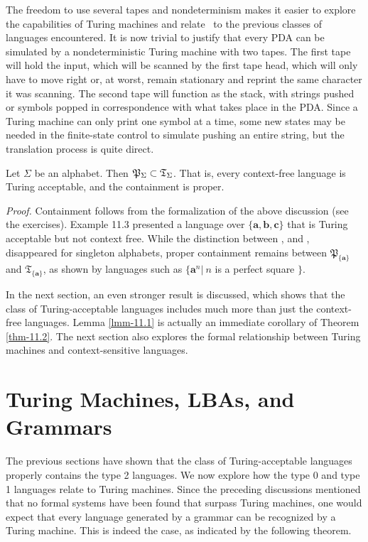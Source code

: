The freedom to use several tapes and nondeterminism makes it easier to explore
the capabilities of Turing machines and relate \TSIG\ to the previous classes of
languages encountered. It is now trivial to justify that every PDA can be
simulated by a nondeterministic Turing machine with two tapes. The first tape
will hold the input, which will be scanned by the first tape head, which will
only have to move right or, at worst, remain stationary and reprint the same
character it was scanning. The second tape will function as the stack, with
strings pushed or symbols popped in correspondence with what takes place in the
PDA. Since a Turing machine can only print one symbol at a time, some new states
may be needed in the finite-state control to simulate pushing an entire string,
but the translation process is quite direct.

\begin{lmm}\label{lmm-11.1}
Let $\Sigma$ be an alphabet. Then $\mathfrak{P}_\Sigma\subset\mathfrak{T}_\Sigma$. That is, every
context-free language is Turing acceptable, and the containment is proper.

\emph{Proof.} Containment follows from the formalization of the above discussion
(see the exercises). Example 11.3 presented a language over $\{\pmb{a},\pmb{b},
\pmb{c}\}$ that is Turing acceptable but not context free. While the distinction
between \DSIG, and \PSIG, disappeared for singleton alphabets, proper
containment remains between $\mathfrak{P}_{\{\pmb{a}\}}$ and $\mathfrak{T}_{\{
\pmb{a}\}}$, as shown by languages such as $\{\pmb{a}^n|\ n$ is a perfect square
$\}$.
\end{lmm}

In the next section, an even stronger result is discussed, which shows that the
class of Turing-acceptable languages includes much more than just the
context-free languages. Lemma \ref{lmm-11.1} is actually an immediate corollary of Theorem
\ref{thm-11.2}. The next section also explores the formal relationship between Turing
machines and context-sensitive languages.

\section{Turing Machines, LBAs, and Grammars}\label{sec-11.3}

The previous sections have shown that the class of Turing-acceptable languages
properly contains the type 2 languages. We now explore how the type 0 and type
1 languages relate to Turing machines. Since the preceding discussions mentioned
that no formal systems have been found that surpass Turing machines, one would
expect that every language generated by a grammar can be recognized by a Turing
machine. This is indeed the case, as indicated by the following theorem.

